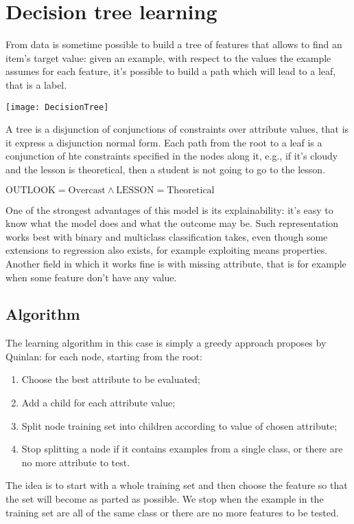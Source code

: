 \chapter{Decision tree learning}
From data is sometime possible to build a tree of features that allows to find an item's target value: given an example, with respect to the values the example assumes for each feature, it's possible to build a path which will lead to a leaf, that is a label.
\begin{center}
\texttt{[image: DecisionTree]}
\end{center}
A tree is a disjunction of conjunctions of constraints over attribute values, that is it express a disjunction normal form. Each path from the root to a leaf is a conjunction of hte constraints specified in the nodes along it, e.g., if it's cloudy and the lesson is theoretical, then a student is not going to go to the lesson.
\begin{center}
	$\displaystyle \text{OUTLOOK}=\text{Overcast}\wedge \text{LESSON}=\text{Theoretical}$
\end{center}
One of the strongest advantages of this model is its explainability: it's easy to know what the model does and what the outcome may be. \newline
Such representation works best with binary and multiclass classification takes, even though some extensions to regression also exists, for example exploiting means properties. Another field in which it works fine is with missing attribute, that is for example when some feature don't have any value. \newline
%
%
%
\section{Algorithm}
The learning algorithm in this case is simply a greedy approach proposes by Quinlan: for each node, starting from the root:
\begin{enumerate}
	\item Choose the best attribute to be evaluated;
	\item Add a child for each attribute value;
	\item Split node training set into children according to value of chosen attribute;
	\item Stop splitting a node if it contains examples from a single class, or there are no more attribute to test.
\end{enumerate}
The idea is to start with a whole training set and then choose the feature so that the set will become as parted as possible. We stop when the example in the training set are all of the same class or there are no more features to be tested.\newline 
%
%
